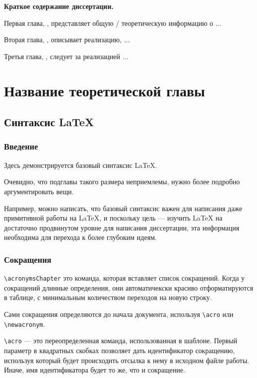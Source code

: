 \documentclass[a4paper,12pt]{report}
\begin{document}
\textbf{Краткое содержание диссертации.}

Первая глава, , представляет общую / теоретическую информацию о ...

Вторая глава, , описывает реализацию, ...

Третья глава, , следует за реализацией ...

\chapter{Название теоретической главы}\label{intro_chapter_title}

\section{Синтаксис \LaTeX{}}

\subsection{Введение}

Здесь демонстрируется базовый синтаксис \LaTeX{}.

Очевидно, что подглавы такого размера неприемлемы,
нужно более подробно аргументировать вещи.

Например, можно написать, что базовый синтаксис важен
для написания даже примитивной работы на \LaTeX{}, и поскольку
цель — изучить \LaTeX{} на достаточно продвинутом уровне для написания
диссертации, эта информация необходима для перехода к более глубоким идеям.

\subsection{Сокращения}

\verb|\acronymsChapter| это команда, которая вставляет список сокращений.
Когда у сокращений длинные определения, они автоматичекски красиво отформатируются в таблице,
с минимальным количеством переходов на новую строку.

Сами сокращения определяются до начала документа, используя \verb|\acro| или \verb|\newacronym|.

\verb|\acro| --- это переопределенная команда, использованная в шаблоне.
Первый параметр в квадратных скобках позволяет дать идентификатор сокращению, используя который
будет происходить отсылка к нему в исходном файле работы.
Иначе, имя идентификатора будет то же, что и сокращение.
\end{document}
